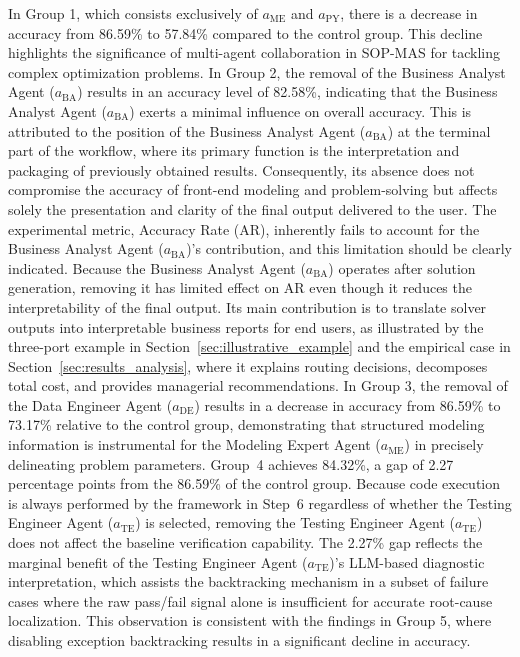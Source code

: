 \documentclass[preprint,12pt]{elsarticle}
\begin{document}
In Group 1, which consists exclusively of $a_{\text{ME}}$ and $a_{\text{PY}}$, there is a decrease in accuracy from 86.59\% to 57.84\% compared to the control group. This decline highlights the significance of multi-agent collaboration in SOP-MAS for tackling complex optimization problems. In Group 2, the removal of the Business Analyst Agent ($a_{\text{BA}}$) results in an accuracy level of 82.58\%, indicating that the Business Analyst Agent ($a_{\text{BA}}$) exerts a minimal influence on overall accuracy. This is attributed to the position of the Business Analyst Agent ($a_{\text{BA}}$) at the terminal part of the workflow, where its primary function is the interpretation and packaging of previously obtained results. Consequently, its absence does not compromise the accuracy of front-end modeling and problem-solving but affects solely the presentation and clarity of the final output delivered to the user. The experimental metric, Accuracy Rate (AR), inherently fails to account for the Business Analyst Agent ($a_{\text{BA}}$)'s contribution, and this limitation should be clearly indicated. Because the Business Analyst Agent ($a_{\text{BA}}$) operates after solution generation, removing it has limited effect on AR even though it reduces the interpretability of the final output. Its main contribution is to translate solver outputs into interpretable business reports for end users, as illustrated by the three-port example in Section~\ref{sec:illustrative_example} and the empirical case in Section~\ref{sec:results_analysis}, where it explains routing decisions, decomposes total cost, and provides managerial recommendations. In Group 3, the removal of the Data Engineer Agent ($a_{\text{DE}}$) results in a decrease in accuracy from 86.59\% to 73.17\% relative to the control group, demonstrating that structured modeling information is instrumental for the Modeling Expert Agent ($a_{\text{ME}}$) in precisely delineating problem parameters. Group~4 achieves 84.32\%, a gap of 2.27 percentage points from the 86.59\% of the control group. Because code execution is always performed by the framework in Step~6 regardless of whether the Testing Engineer Agent ($a_{\text{TE}}$) is selected, removing the Testing Engineer Agent ($a_{\text{TE}}$) does not affect the baseline verification capability. The 2.27\% gap reflects the marginal benefit of the Testing Engineer Agent ($a_{\text{TE}}$)'s LLM-based diagnostic interpretation, which assists the backtracking mechanism in a subset of failure cases where the raw pass/fail signal alone is insufficient for accurate root-cause localization. This observation is consistent with the findings in Group 5, where disabling exception backtracking results in a significant decline in accuracy.
\end{document}
